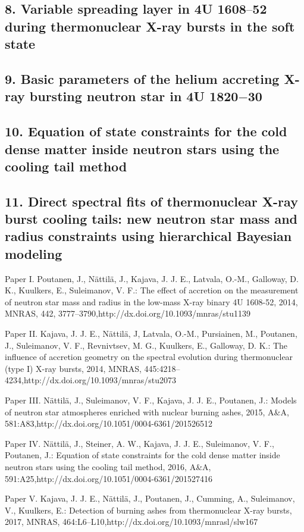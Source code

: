 \subsection*{8. Variable spreading layer in 4U 1608$–$52 during thermonuclear X-ray bursts in the soft state}

\subsection*{9. Basic parameters of the helium accreting X-ray bursting neutron star in 4U 1820$-$30}

\subsection*{10. Equation of state constraints for the cold dense matter inside neutron stars using the cooling tail method}

\subsection*{11. Direct spectral fits of thermonuclear X-ray burst cooling tails: new neutron star mass and radius constraints using hierarchical Bayesian modeling} 


Paper I. Poutanen, J., Nättilä, J., Kajava, J. J. E., Latvala, O.-M., Galloway, D. K., Kuulkers, E., Suleimanov, V. F.: The effect of accretion on the measurement of neutron star mass and radius in the low-mass X-ray binary 4U 1608-52, 2014, MNRAS, 442, 3777–3790,http://dx.doi.org/10.1093/mnras/stu1139

Paper II. Kajava, J. J. E., Nättilä, J, Latvala, O.-M., Pursiainen, M., Poutanen, J., Suleimanov, V. F., Revnivtsev, M. G., Kuulkers, E., Galloway, D. K.: The influence of accretion geometry on the spectral evolution during thermonuclear (type I) X-ray bursts, 2014, MNRAS, 445:4218–4234,http://dx.doi.org/10.1093/mnras/stu2073

Paper III. Nättilä, J., Suleimanov, V. F., Kajava, J. J. E., Poutanen, J.: Models of neutron star atmospheres enriched with nuclear burning ashes, 2015, A&A, 581:A83,http://dx.doi.org/10.1051/0004-6361/201526512

Paper IV. Nättilä, J., Steiner, A. W., Kajava, J. J. E., Suleimanov, V. F., Poutanen, J.: Equation of state constraints for the cold dense matter inside neutron stars using the cooling tail method, 2016, A&A, 591:A25,http://dx.doi.org/10.1051/0004-6361/201527416

Paper V. Kajava, J. J. E., Nättilä, J., Poutanen, J., Cumming, A., Suleimanov, V., Kuulkers, E.: Detection of burning ashes from thermonuclear X-ray bursts, 2017, MNRAS, 464:L6–L10,http://dx.doi.org/10.1093/mnrasl/slw167

